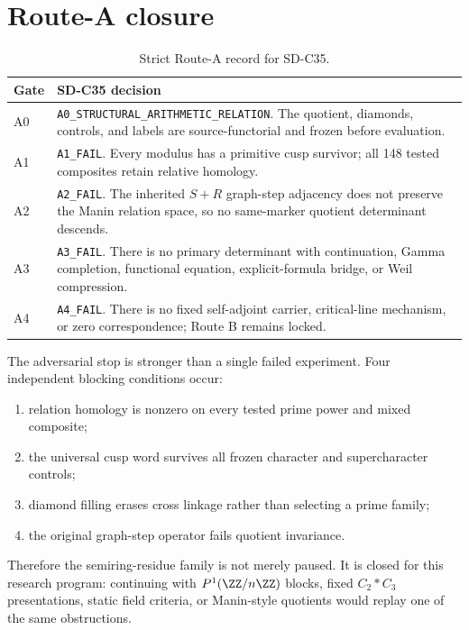 \section{Route-A closure}
\label{sec:route}

\begin{table}[H]
\centering
\small
\begin{tabularx}{\textwidth}{L{0.25\textwidth}Y}
\toprule
Gate & SD-C35 decision\\
\midrule
A0 & \texttt{A0\_STRUCTURAL\_ARITHMETIC\_RELATION}.  The quotient, diamonds,
controls, and labels are source-functorial and frozen before evaluation.\\
A1 & \texttt{A1\_FAIL}.  Every modulus has a primitive cusp survivor; all 148
tested composites retain relative homology.\\
A2 & \texttt{A2\_FAIL}.  The inherited $S+R$ graph-step adjacency does not
preserve the Manin relation space, so no same-marker quotient determinant
descends.\\
A3 & \texttt{A3\_FAIL}.  There is no primary determinant with continuation,
Gamma completion, functional equation, explicit-formula bridge, or Weil
compression.\\
A4 & \texttt{A4\_FAIL}.  There is no fixed self-adjoint carrier, critical-line
mechanism, or zero correspondence; Route B remains locked.\\
\bottomrule
\end{tabularx}
\caption{Strict Route-A record for SD-C35.}
\label{tab:route}
\end{table}

The adversarial stop is stronger than a single failed experiment.  Four
independent blocking conditions occur:
\begin{enumerate}
  \item relation homology is nonzero on every tested prime power and mixed
  composite;
  \item the universal cusp word survives all frozen character and
  supercharacter controls;
  \item diamond filling erases cross linkage rather than selecting a prime
  family;
  \item the original graph-step operator fails quotient invariance.
\end{enumerate}
Therefore the semiring-residue family is not merely paused.  It is closed for
this research program: continuing with $P^1(\ZZ/n\ZZ)$ blocks, fixed
$C_2*C_3$ presentations, static field criteria, or Manin-style quotients would
replay one of the same obstructions.
